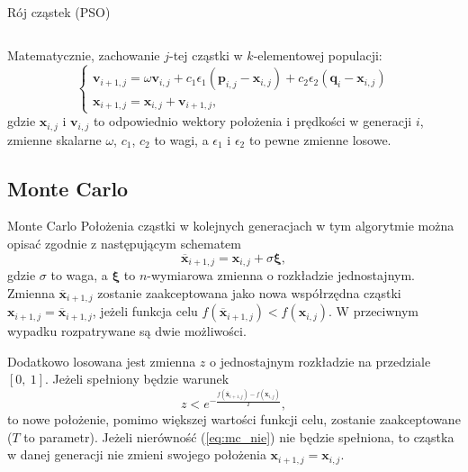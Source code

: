 \documentclass[handout]{beamer}
\newcommand{\vect}[1]{\bm{\mathbf{#1}}}
\begin{document}
\begin{frame}{Rój cząstek (PSO)}
\begin{columns}
\begin{column}[t]{0.5\textwidth}
\end{column}
\end{columns}

Matematycznie, zachowanie $j$-tej cząstki w $k$-elementowej populacji:
\begin{equation}
\begin{cases}
\vect{v}_{i + 1, j} = \omega \vect{v}_{i, j} + c_{1} \epsilon_{1} \left(\vect{p}_{i, j} - \vect{x}_{i, j}\right) + c_{2} \epsilon_{2} \left(\vect{q}_{i} - \vect{x}_{i, j}\right) \\
\vect{x}_{i + 1, j} = \vect{x}_{i, j} + \vect{v}_{i + 1, j},
\end{cases}
\end{equation}
gdzie $\vect{x}_{i, j}$ i $\vect{v}_{i, j}$ to odpowiednio wektory położenia i prędkości w generacji $i$, zmienne skalarne $\omega$, $c_1$, $c_2$ to wagi, a $\epsilon_{1}$ i  $\epsilon_{2}$ to pewne zmienne losowe.


\end{frame}

\subsection{Monte Carlo}
\begin{frame}{Monte Carlo}
Położenia cząstki w kolejnych generacjach w tym algorytmie można opisać zgodnie z następującym schematem
\begin{equation}
\vect{\overline{x}}_{i + 1, j} = \vect{x}_{i, j} + \sigma\vect{\xi},
\end{equation}
gdzie $\sigma$ to waga, a $\vect{\xi}$ to $n$-wymiarowa zmienna o rozkładzie jednostajnym. Zmienna $\vect{\overline{x}}_{i + 1, j}$ zostanie zaakceptowana jako nowa współrzędna cząstki $\vect{x}_{i + 1, j} = \vect{\overline{x}}_{i + 1, j}$, jeżeli funkcja celu $f\left(\vect{\overline{x}}_{i + 1, j}\right) < f\left(\vect{x}_{i, j}\right)$. W przeciwnym wypadku rozpatrywane są dwie możliwości.

Dodatkowo losowana jest zmienna $z$ o jednostajnym rozkładzie na przedziale $\left[0, \ 1 \right]$. Jeżeli spełniony będzie warunek
\begin{equation} \label{eq:mc_nie}
z < e^{-\frac{f\left(\vect{\overline{x}}_{i + 1, j}\right) - f\left(\vect{x}_{i, j}\right)}{T}},
\end{equation}
to nowe położenie, pomimo większej wartości funkcji celu, zostanie zaakceptowane ($T$ to parametr). Jeżeli nierówność (\ref{eq:mc_nie}) nie będzie spełniona, to cząstka w danej generacji nie zmieni swojego położenia $\vect{x}_{i + 1, j} = \vect{x}_{i, j}$. 
\end{frame}
\end{document}
